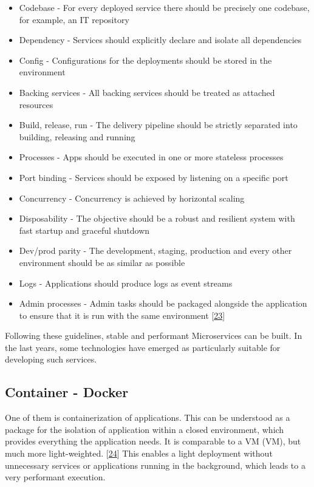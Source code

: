 \documentclass[12pt,english,a4paper,oneside,,tablecaptionabove]{scrbook}
\providecommand{\tightlist}{%
  \setlength{\itemsep}{0pt}\setlength{\parskip}{0pt}}
\begin{document}
\begin{itemize}
\tightlist
\item
  Codebase - For every deployed service there should be precisely one
  codebase, for example, an IT repository
\item
  Dependency - Services should explicitly declare and isolate all
  dependencies
\item
  Config - Configurations for the deployments should be stored in the
  environment
\item
  Backing services - All backing services should be treated as attached
  resources
\item
  Build, release, run - The delivery pipeline should be strictly
  separated into building, releasing and running
\item
  Processes - Apps should be executed in one or more stateless processes
\item
  Port binding - Services should be exposed by listening on a specific
  port
\item
  Concurrency - Concurrency is achieved by horizontal scaling
\item
  Disposability - The objective should be a robust and resilient system
  with fast startup and graceful shutdown
\item
  Dev/prod parity - The development, staging, production and every other
  environment should be as similar as possible
\item
  Logs - Applications should produce logs as event streams
\item
  Admin processes - Admin tasks should be packaged alongside the
  application to ensure that it is run with the same environment
  {[}\protect\hyperlink{ref-Wiggins}{23}{]}
\end{itemize}

Following these guidelines, stable and performant Microservices can be
built. In the last years, some technologies have emerged as particularly
suitable for developing such services.

\hypertarget{container---docker}{%
\subsection{Container - Docker}\label{container---docker}}

One of them is containerization of applications. This can be understood
as a package for the isolation of application within a closed
environment, which provides everything the application needs. It is
comparable to a \acs{VM} (\acl{VM}), but much more light-weighted.
{[}\protect\hyperlink{ref-Jerry2015}{24}{]} This enables a light
deployment without unnecessary services or applications running in the
background, which leads to a very performant execution.
\end{document}
